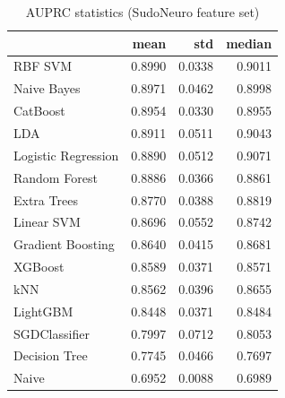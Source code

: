 \begin{table}
\caption{AUPRC statistics (SudoNeuro feature set)}
\label{tab:auprc_SudoNeuro_stats}
\begin{tabular}{lrrr}
\toprule
 & mean & std & median \\
\midrule
RBF SVM & 0.8990 & 0.0338 & 0.9011 \\
Naive Bayes & 0.8971 & 0.0462 & 0.8998 \\
CatBoost & 0.8954 & 0.0330 & 0.8955 \\
LDA & 0.8911 & 0.0511 & 0.9043 \\
Logistic Regression & 0.8890 & 0.0512 & 0.9071 \\
Random Forest & 0.8886 & 0.0366 & 0.8861 \\
Extra Trees & 0.8770 & 0.0388 & 0.8819 \\
Linear SVM & 0.8696 & 0.0552 & 0.8742 \\
Gradient Boosting & 0.8640 & 0.0415 & 0.8681 \\
XGBoost & 0.8589 & 0.0371 & 0.8571 \\
kNN & 0.8562 & 0.0396 & 0.8655 \\
LightGBM & 0.8448 & 0.0371 & 0.8484 \\
SGDClassifier & 0.7997 & 0.0712 & 0.8053 \\
Decision Tree & 0.7745 & 0.0466 & 0.7697 \\
Naive & 0.6952 & 0.0088 & 0.6989 \\
\bottomrule
\end{tabular}
\end{table}
